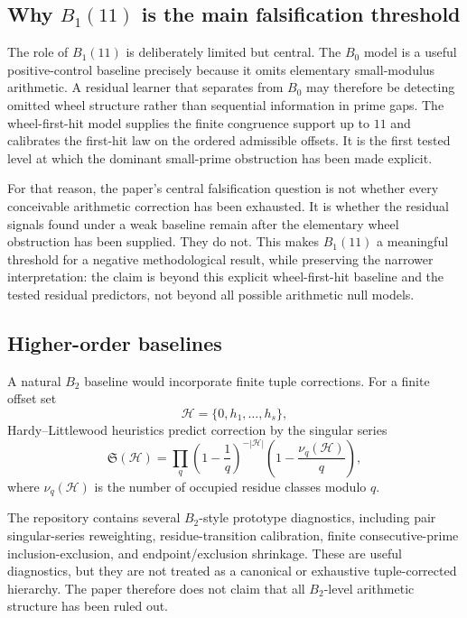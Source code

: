 \documentclass[11pt]{article}
\begin{document}
\subsection{Why $B_1(11)$ is the main falsification threshold}

The role of $B_1(11)$ is deliberately limited but central. The $B_0$ model is a useful positive-control baseline precisely because it omits elementary small-modulus arithmetic. A residual learner that separates from $B_0$ may therefore be detecting omitted wheel structure rather than sequential information in prime gaps. The wheel-first-hit model supplies the finite congruence support up to $11$ and calibrates the first-hit law on the ordered admissible offsets. It is the first tested level at which the dominant small-prime obstruction has been made explicit.

For that reason, the paper's central falsification question is not whether every conceivable arithmetic correction has been exhausted. It is whether the residual signals found under a weak baseline remain after the elementary wheel obstruction has been supplied. They do not. This makes $B_1(11)$ a meaningful threshold for a negative methodological result, while preserving the narrower interpretation: the claim is beyond this explicit wheel-first-hit baseline and the tested residual predictors, not beyond all possible arithmetic null models.

\subsection{Higher-order baselines}

A natural $B_2$ baseline would incorporate finite tuple corrections. For a finite offset set
\[
\mathcal H=\{0,h_1,\ldots,h_s\},
\]
Hardy--Littlewood heuristics predict correction by the singular series \citep{hardylittlewood1923}
\[
\mathfrak S(\mathcal H)=
\prod_q
\left(1-\frac1q\right)^{-|\mathcal H|}
\left(1-\frac{\nu_q(\mathcal H)}q\right),
\]
where $\nu_q(\mathcal H)$ is the number of occupied residue classes modulo $q$.

The repository contains several $B_2$-style prototype diagnostics, including pair singular-series reweighting, residue-transition calibration, finite consecutive-prime inclusion-exclusion, and endpoint/exclusion shrinkage. These are useful diagnostics, but they are not treated as a canonical or exhaustive tuple-corrected hierarchy. The paper therefore does not claim that all $B_2$-level arithmetic structure has been ruled out.
\end{document}
